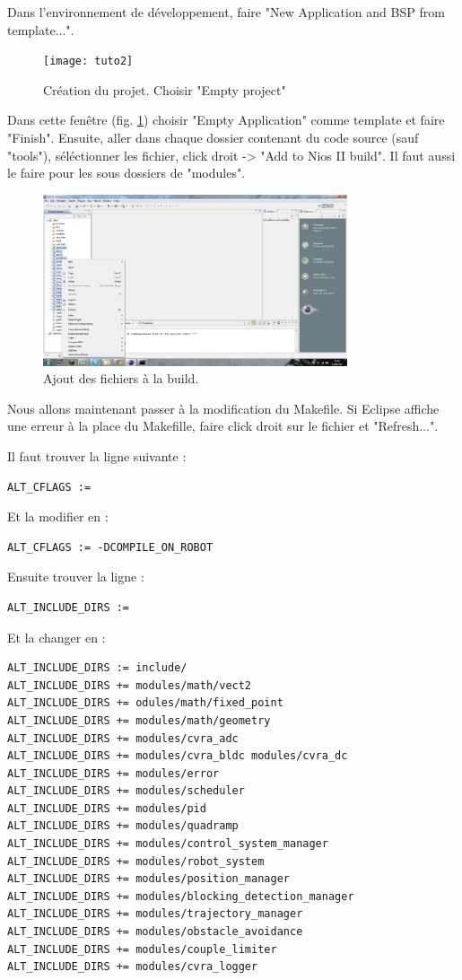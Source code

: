 \documentclass[a4paper]{report}
\begin{document}
Dans l'environnement de développement, faire "New Application and BSP from template...".
\begin{figure}[h!]
  \centering
    \texttt{[image: tuto2]}
  \caption{Création du projet. Choisir "Empty project"}
  \label{projectcreation}
\end{figure}
Dans cette fenêtre (fig. \ref{projectcreation}) choisir "Empty Application" comme template et faire "Finish".
Ensuite, aller dans chaque dossier contenant du code source (sauf "tools"), séléctionner les fichier, 
click droit -> "Add to Nios II build". Il faut aussi le faire pour les sous dossiers de "modules".

\begin{figure}[h!]
  \centering
    \includegraphics[width=0.8\textwidth]{4}
  \caption{Ajout des fichiers à la build.}
  \label{aa}
\end{figure}


Nous allons maintenant passer à la modification du Makefile. Si Eclipse affiche une erreur à la place du Makefille, faire click droit sur le
fichier et "Refresh...". 

Il faut trouver la ligne suivante :
\begin{lstlisting}[frame=trBL]
ALT_CFLAGS := 
\end{lstlisting}
Et la modifier en :
\begin{lstlisting}[frame=trBL]
ALT_CFLAGS := -DCOMPILE_ON_ROBOT
\end{lstlisting}
Ensuite trouver la ligne :
\begin{lstlisting}[frame=trBL]
ALT_INCLUDE_DIRS :=
\end{lstlisting}
Et la changer en :
\begin{lstlisting}[frame=trBL]
ALT_INCLUDE_DIRS := include/
ALT_INCLUDE_DIRS += modules/math/vect2 
ALT_INCLUDE_DIRS += odules/math/fixed_point 
ALT_INCLUDE_DIRS += modules/math/geometry
ALT_INCLUDE_DIRS += modules/cvra_adc 
ALT_INCLUDE_DIRS += modules/cvra_bldc modules/cvra_dc
ALT_INCLUDE_DIRS += modules/error 
ALT_INCLUDE_DIRS += modules/scheduler
ALT_INCLUDE_DIRS += modules/pid 
ALT_INCLUDE_DIRS += modules/quadramp 
ALT_INCLUDE_DIRS += modules/control_system_manager
ALT_INCLUDE_DIRS += modules/robot_system 
ALT_INCLUDE_DIRS += modules/position_manager 
ALT_INCLUDE_DIRS += modules/blocking_detection_manager
ALT_INCLUDE_DIRS += modules/trajectory_manager
ALT_INCLUDE_DIRS += modules/obstacle_avoidance
ALT_INCLUDE_DIRS += modules/couple_limiter 
ALT_INCLUDE_DIRS += modules/cvra_logger
\end{lstlisting}
\end{document}
